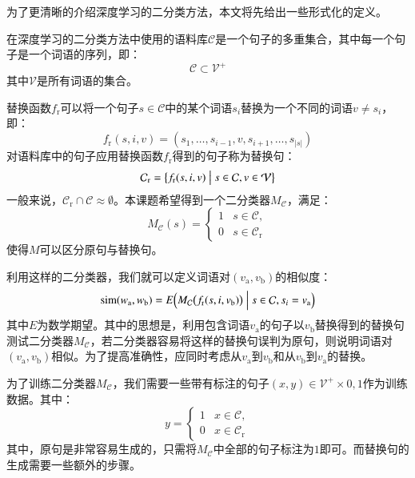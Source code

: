 
为了更清晰的介绍深度学习的二分类方法，本文将先给出一些形式化的定义。

在深度学习的二分类方法中使用的语料库$\mathcal{C}$是一个句子的多重集合，其中每一个句子是一个词语的序列，即：
\begin{equation}
\mathcal{C} \subset \mathcal{V}^+
\end{equation}
其中$\mathcal{V}$是所有词语的集合。

替换函数$f_\text{r}$可以将一个句子$s \in \mathcal{C}$中的某个词语$s_i$替换为一个不同的词语$v \ne s_i$，即：
\begin{equation}
f_\text{r}(s, i, v) = (s_1, \dots, s_{i - 1}, v, s_{i + 1}, \dots, s_{|s|})
\end{equation}
对语料库中的句子应用替换函数$f_\text{r}$得到的句子称为替换句：
\begin{equation}
\mathcal{C}_\text{r} = \bigl\{f_\text{r}(s, i, v) \bigm| s \in \mathcal{C}, v \in \mathcal{V}\bigr\}
\end{equation}
一般来说，$\mathcal{C}_\text{r} \cap \mathcal{C} \approx \emptyset$。本课题希望得到一个二分类器$M_\mathcal{C}$，满足：
\begin{equation}
M_\mathcal{C}(s) = 
\begin{cases}
1 & s \in \mathcal{C}, \\
0 & s \in \mathcal{C}_\text{r}
\end{cases}
\end{equation}
使得$M$可以区分原句与替换句。

利用这样的二分类器，我们就可以定义词语对$(v_\text{a}, v_\text{b})$的相似度：
\begin{equation}
\operatorname{sim}(w_\text{a}, w_\text{b}) = E\Bigl(M_\mathcal{C}\bigl(f_\text{r}(s, i, v_\text{b})\bigr) \Bigm| s \in \mathcal{C}, s_i = v_\text{a}\Bigr)
\end{equation}
其中$E$为数学期望。其中的思想是，利用包含词语$v_\text{a}$的句子以$v_\text{b}$替换得到的替换句测试二分类器$M_\mathcal{C}$，若二分类器容易将这样的替换句误判为原句，则说明词语对$(v_\text{a}, v_\text{b})$相似。为了提高准确性，应同时考虑从$v_\text{a}$到$v_\text{b}$和从$v_\text{b}$到$v_\text{a}$的替换。

为了训练二分类器$M_\mathcal{C}$，我们需要一些带有标注的句子$(x, y) \in \mathcal{V}^+ \times {0, 1}$作为训练数据。其中：
\begin{equation}
	y = 
	\begin{cases}
		1 & x \in \mathcal{C}, \\
		0 & x \in \mathcal{C}_\text{r}
	\end{cases}
\end{equation}
其中，原句是非常容易生成的，只需将$M_\mathcal{C}$中全部的句子标注为$1$即可。而替换句的生成需要一些额外的步骤。

